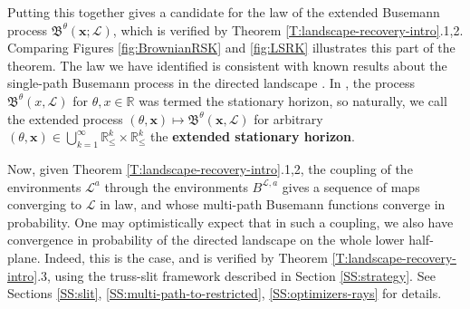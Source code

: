 \documentclass[11pt]{article}
\newcommand{\N}{\mathbb{N}}
\newcommand{\R}{\mathbb{R}}
\newcommand{\cC}{\mathcal{C}}
\newcommand{\cL}{\mathcal{L}}
\newcommand{\fA}{\mathfrak{A}}
\newcommand{\fB}{\mathfrak{B}}
\newcommand{\X}{\times}
\newcommand{\bx}{\mathbf{x}}
\newtheorem{theorem}{Theorem}[section]
\theoremstyle{definition} %
\theoremstyle{remark} %
\begin{document}
Putting this together gives a candidate for the law of the extended Busemann process $\fB^\theta(\bx; \cL)$, which is verified by Theorem \ref{T:landscape-recovery-intro}.1,2. Comparing Figures \ref{fig:BrownianRSK} and \ref{fig:LSRK} illustrates this part of the theorem. The law we have identified is consistent with known results about the single-path Busemann process in the directed landscape \cite{rahman2021infinite, busani2021diffusive, busani2024stationary}. In \cite{busani2021diffusive}, the process $\fB^\theta(x, \cL)$ for $\theta, x \in \R$ was termed the stationary horizon, so naturally, we call the extended process $(\theta, \bx) \mapsto \fB^\theta(\bx, \cL)$ for arbitrary $(\theta, \bx) \in \bigcup_{k=1}^\infty \R^k_\le \X \R^k_\le$ the \textbf{extended stationary horizon}.

Now, given Theorem \ref{T:landscape-recovery-intro}.1,2, the coupling of the environments $\cL^a$ through the environments $B^{\cL, a}$ gives a sequence of maps converging to $\cL$ in law, and whose multi-path Busemann functions converge in probability. One may optimistically expect that in such a coupling, we also have convergence in probability of the directed landscape on the whole lower half-plane. Indeed, this is the case, and is verified by Theorem \ref{T:landscape-recovery-intro}.3, using the truss-slit framework described in Section \ref{SS:strategy}. See Sections \ref{SS:slit}, \ref{SS:multi-path-to-restricted}, \ref{SS:optimizers-rays} for details.


\end{document}

